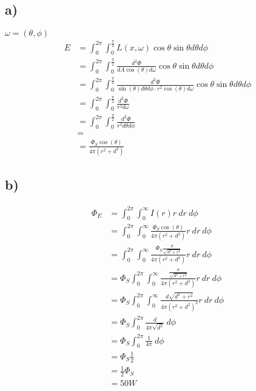 \documentclass[a4paper]{scrartcl}
\begin{document}
\subsection*{a)}
$\omega = (\theta, \phi)$
\begin{align*}
  E &= \int_{0}^{2\pi} \int_0^{\frac{\pi}{2}} L(x, \omega) \cos \theta \sin \theta d \theta d \phi \\
  &= \int_{0}^{2\pi} \int_0^{\frac{\pi}{2}} \frac{d^2 \Phi}{dA \cos(\theta) d\omega} \cos \theta \sin \theta d \theta d \phi \\
  &= \int_{0}^{2\pi} \int_0^{\frac{\pi}{2}} \frac{d^2 \Phi}{\sin(\theta) d \theta d \phi \cdot r^2 \cos(\theta) d\omega} \cos \theta \sin \theta d \theta d \phi \\
  &= \int_{0}^{2\pi} \int_0^{\frac{\pi}{2}} \frac{d^2 \Phi}{r^2 d \omega} \\
  &= \int_{0}^{2\pi} \int_0^{\frac{\pi}{2}} \frac{d^2 \Phi}{r^2 d \theta d \phi} \\
  &= \\
  &= \frac{\Phi_S \cos(\theta)}{4 \pi(r^2 + d^2)}
\end{align*}



\subsection*{b)}
\begin{align*}
  \Phi_E &= \int_{0}^{2\pi} \int_{0}^{\infty} I(r)r\ dr\ d\phi \\
  &= \int_{0}^{2\pi} \int_{0}^{\infty} \frac{\Phi_S \cos(\theta)}{4\pi(r^2 + d^2)} r\ dr\ d\phi \\
  &= \int_{0}^{2\pi} \int_{0}^{\infty} \frac{\Phi_S \frac{d}{\sqrt{d^2 + r^2}}}{4\pi(r^2 + d^2)} r\ dr\ d\phi \\
  &= \Phi_S \int_{0}^{2\pi} \int_{0}^{\infty} \frac{\frac{d}{\sqrt{d^2 + r^2}}}{4\pi(r^2 + d^2)} r\ dr\ d\phi \\
  &= \Phi_S \int_{0}^{2\pi} \int_{0}^{\infty} \frac{d\sqrt{d^2+r^2}}{4\pi \left(r^2+d^2\right)^2} r\ dr\ d\phi \\
  &= \Phi_S \int_{0}^{2\pi} \frac{d}{4\pi \sqrt{d^2}}\ d\phi \\
  &= \Phi_S \int_{0}^{2\pi} \frac{1}{4\pi}\ d\phi \\
  &= \Phi_S \frac{1}{2} \\
  &= \frac{1}{2} \Phi_S \\
  &= 50 W
\end{align*}
\end{document}
